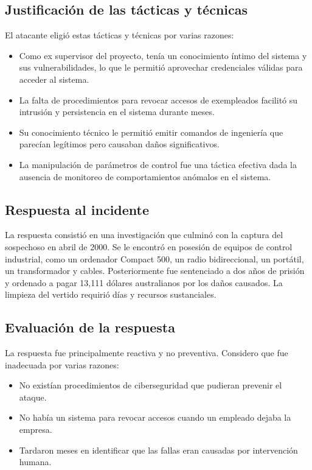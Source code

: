 \subsection{Justificación de las tácticas y técnicas}
El atacante eligió estas tácticas y técnicas por varias razones:

\begin{itemize}
    \item Como ex supervisor del proyecto, tenía un conocimiento íntimo del sistema y sus vulnerabilidades, lo que le permitió aprovechar credenciales válidas para acceder al sistema.
    
    \item La falta de procedimientos para revocar accesos de exempleados facilitó su intrusión y persistencia en el sistema durante meses.
    
    \item Su conocimiento técnico le permitió emitir comandos de ingeniería que parecían legítimos pero causaban daños significativos.
    
    \item La manipulación de parámetros de control fue una táctica efectiva dada la ausencia de monitoreo de comportamientos anómalos en el sistema.
\end{itemize}

\subsection{Respuesta al incidente}
La respuesta consistió en una investigación que culminó con la captura del sospechoso en abril de 2000. Se le encontró en posesión de equipos de control industrial, como un ordenador Compact 500, un radio bidireccional, un portátil, un transformador y cables. Posteriormente fue sentenciado a dos años de prisión y ordenado a pagar 13,111 dólares australianos por los daños causados. La limpieza del vertido requirió días y recursos sustanciales.

\subsection{Evaluación de la respuesta}
La respuesta fue principalmente reactiva y no preventiva. Considero que fue inadecuada por varias razones:

\begin{itemize}
    \item No existían procedimientos de ciberseguridad que pudieran prevenir el ataque.
    \item No había un sistema para revocar accesos cuando un empleado dejaba la empresa.
    \item Tardaron meses en identificar que las fallas eran causadas por intervención humana.
\end{itemize}

